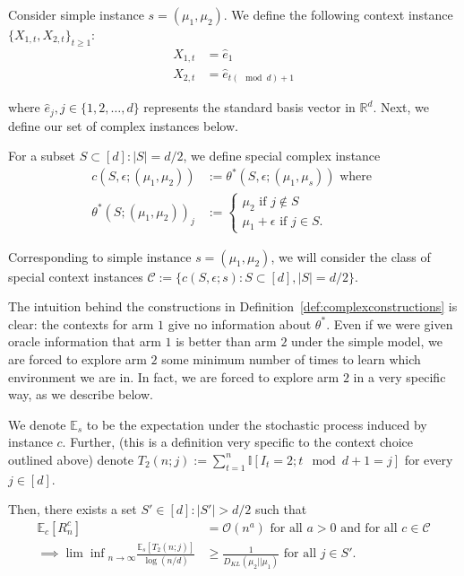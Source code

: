 \begin{Proof}
Consider simple instance $s = (\mu_1, \mu_2)$.
We define the following context instance $\{X_{1,t}, X_{2,t}\}_{t \geq 1}$:
\begin{align*}
    X_{1,t} &= \hat{e}_1 \\
    X_{2,t} &= \hat{e}_{t (\mod d) + 1}
\end{align*}

where $\hat{e}_j, j \in \{1,2,\ldots, d\}$ represents the standard basis vector in $\mathbb{R}^d$.
Next, we define our set of complex instances below.

\begin{definition}\label{def:complexconstructions}
For a subset $S \subset [d]: |S| = d/2$, we define special complex instance 
\begin{align*}
c(S, \epsilon;(\mu_1, \mu_2)) &:= \theta^*(S, \epsilon;(\mu_1,\mu_s)) \text{ where } \\
    \theta^*(S;(\mu_1,\mu_2))_j &:= \begin{cases}
    \mu_2 \text{ if } j \notin S \\
    \mu_1 + \epsilon \text{ if } j \in S .
    \end{cases}
\end{align*}

Corresponding to simple instance $s = (\mu_1,\mu_2)$, we will consider the class of special context instances $\mathcal{C} := \{c(S, \epsilon;s): S \subset [d], |S| = d/2\}$.
\end{definition}

The intuition behind the constructions in Definition~\ref{def:complexconstructions} is clear: the contexts for arm $1$ give no information about $\theta^*$.
Even if we were given oracle information that arm $1$ is better than arm $2$ under the simple model, we are forced to explore arm $2$ some minimum number of times to learn which environment we are in.
In fact, we are forced to explore arm $2$ in a very specific way, as we describe below.

\begin{lemma}\label{lem:samplinglowerbound}
We denote $\mathbb{E}_s$ to be the expectation under the stochastic process induced by instance $c$.
Further, (this is a definition very specific to the context choice outlined above) denote $T_2(n;j) := \sum_{t=1}^n \mathbb{I}[I_t = 2; t \mod d + 1 = j]$ for every $j \in [d]$.

Then, there exists a set $S' \in [d]: |S'| > d/2$ such that
\begin{subequations}
\begin{align}
    \mathbb{E}_c[R_n^c] &= \mathcal{O}(n^a) \text{ for all $a > 0$ and for all $c \in \mathcal{C}$} \label{eq:complexcondition} \\
    \implies {\lim \inf}_{n \to \infty} \frac{\mathbb{E}_s[T_2(n;j)]}{\log \left(n/d\right)} &\geq \frac{1}{D_{KL}(\mu_2 || \mu_1)} \text{ for all } j \in S' . \label{eq:samplinglowerbound}
\end{align}
\end{subequations}


\end{lemma}
\end{Proof}
